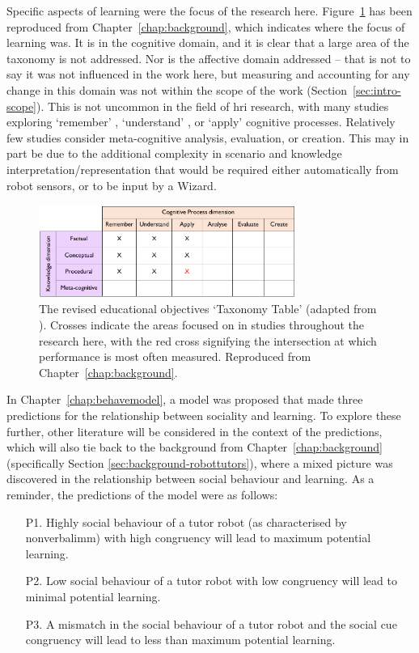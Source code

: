 Specific aspects of \gls{learning} were the focus of the research here. Figure~\ref{fig:ch10-learningtaxonomy} has been reproduced from Chapter~\ref{chap:background}, which indicates where the focus of learning was. It is in the cognitive domain, and it is clear that a large area of the taxonomy is not addressed. Nor is the affective domain addressed -- that is not to say it was not influenced in the work here, but measuring and accounting for any change in this domain was not within the scope of the work (Section~\ref{sec:intro-scope}). This is not uncommon in the field of \acrshort{hri} research, with many studies exploring `remember' \citep{alemi2014employing,szafir2012pay}, `understand' \citep{kory2014storytelling,tanaka2012children}, or `apply' \citep{leyzberg2014personalizing} cognitive processes. Relatively few studies consider meta-cognitive analysis, evaluation, or creation. This may in part be due to the additional complexity in scenario and knowledge interpretation/representation that would be required either automatically from robot sensors, or to be input by a Wizard.

\begin{figure}[h]
    \centering
    \includegraphics[width=0.75\textwidth]{images/ch2_LearningTaxonomy.pdf}
    \caption{The revised educational objectives `Taxonomy Table' (adapted from \citealp{krathwohl2002revision}). Crosses indicate the areas focused on in studies throughout the research here, with the red cross signifying the intersection at which performance is most often measured. Reproduced from Chapter~\ref{chap:background}.}
    \label{fig:ch10-learningtaxonomy}
\end{figure}

In Chapter~\ref{chap:behavemodel}, a model was proposed that made three predictions for the relationship between sociality and \gls{learning}. To explore these further, other literature will be considered in the context of the predictions, which will also tie back to the background from Chapter~\ref{chap:background} (specifically Section \ref{sec:background-robottutors}), where a mixed picture was discovered in the relationship between social behaviour and \gls{learning}. As a reminder, the predictions of the model were as follows:
\begin{enumerate}
	\item [P1.] Highly social behaviour of a tutor robot (as characterised by \gls{nonverbalimm}) with high congruency will lead to maximum potential \gls{learning}.
	\item [P2.] Low social behaviour of a tutor robot with low congruency will lead to minimal potential \gls{learning}.
	\item [P3.] A mismatch in the social behaviour of a tutor robot and the social cue congruency will lead to less than maximum potential \gls{learning}.
\end{enumerate}

